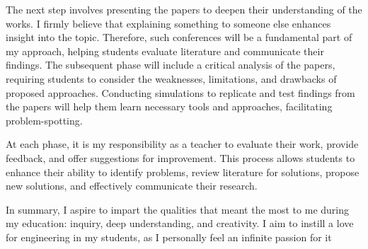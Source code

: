  The next step involves presenting the papers to deepen their understanding of the works. I firmly believe that explaining something to someone else enhances insight into the topic. Therefore, such conferences will be a fundamental part of my approach, helping students evaluate literature and communicate their findings. The subsequent phase will include a critical analysis of the papers, requiring students to consider the weaknesses, limitations, and drawbacks of proposed approaches. Conducting simulations to replicate and test findings from the papers will help them learn necessary tools and approaches, facilitating problem-spotting.

At  each phase, it is my responsibility as a teacher to evaluate their work, provide feedback, and offer suggestions for improvement. This process allows students to enhance their ability to identify problems, review literature for solutions, propose new solutions, and effectively communicate their research.

In summary, I aspire to impart the qualities that meant the most to me during my education: inquiry, deep understanding, and creativity. I aim to instill a love for engineering in my students, as I personally feel an infinite passion for it
